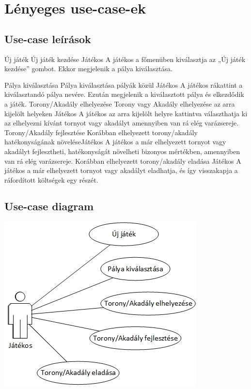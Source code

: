 \section{Lényeges use-case-ek}
\subsection{Use-case leírások}


\usecase
{Új játék}
{Új játék kezdése}
{Játékos}
{A játékos a főmenüben kiválasztja az „Új játék kezdése” gombot. Ekkor megjelenik a pálya kiválasztása.}

\usecase
{Pálya kiválasztása
}{Pálya kiválasztása pályák közül}
{Játékos}
{A játékos rákattint a kiválasztandó pálya nevére. Ezután megjelenik a kiválasztott pálya és elkezdődik a játék.}
\usecase
{Torony/Akadály elhelyezése}
{Torony vagy Akadály elhelyezése az arra kijelölt helyeken}
{Játékos}
{A játékos az arra kijelölt helyre kattintva választhatja ki az elhelyezni kívánt tornyot vagy akadályt amennyiben van rá elég varázsereje. }
\usecase
{Torony/Akadály fejlesztése}
{Korábban elhelyezett torony/akadály hatékonyságának növelése}{Játékos}
{A játékos a már elhelyezett tornyot vagy akadályt fejlesztheti, hatékonyságát növelheti bizonyos mértékben, amennyiben van rá elég varázsereje.}
{Korábban elhelyezett torony/akadály eladása}
{Játékos}
{A játékos a már elhelyezett tornyot vagy akadályt eladhatja, és így visszakapja a ráfordított költségek egy részét.}
\subsection{Use-case diagram}
\centerline
{\includegraphics{./images/2_4_2_use_case_diagram.jpg}}
%




